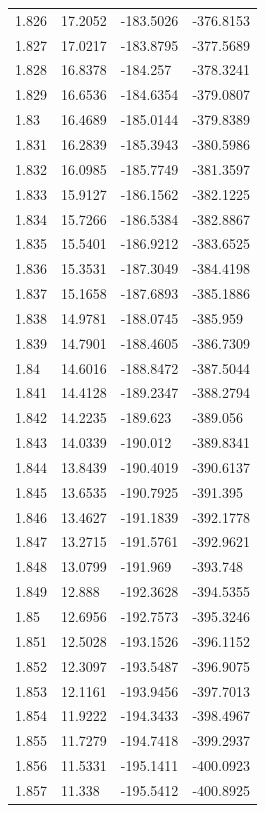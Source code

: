 \begin{tabular}{llll}
1.826 & 17.2052 & -183.5026 & -376.8153 \\
1.827 & 17.0217 & -183.8795 & -377.5689 \\
1.828 & 16.8378 & -184.257 & -378.3241 \\
1.829 & 16.6536 & -184.6354 & -379.0807 \\
1.83 & 16.4689 & -185.0144 & -379.8389 \\
1.831 & 16.2839 & -185.3943 & -380.5986 \\
1.832 & 16.0985 & -185.7749 & -381.3597 \\
1.833 & 15.9127 & -186.1562 & -382.1225 \\
1.834 & 15.7266 & -186.5384 & -382.8867 \\
1.835 & 15.5401 & -186.9212 & -383.6525 \\
1.836 & 15.3531 & -187.3049 & -384.4198 \\
1.837 & 15.1658 & -187.6893 & -385.1886 \\
1.838 & 14.9781 & -188.0745 & -385.959 \\
1.839 & 14.7901 & -188.4605 & -386.7309 \\
1.84 & 14.6016 & -188.8472 & -387.5044 \\
1.841 & 14.4128 & -189.2347 & -388.2794 \\
1.842 & 14.2235 & -189.623 & -389.056 \\
1.843 & 14.0339 & -190.012 & -389.8341 \\
1.844 & 13.8439 & -190.4019 & -390.6137 \\
1.845 & 13.6535 & -190.7925 & -391.395 \\
1.846 & 13.4627 & -191.1839 & -392.1778 \\
1.847 & 13.2715 & -191.5761 & -392.9621 \\
1.848 & 13.0799 & -191.969 & -393.748 \\
1.849 & 12.888 & -192.3628 & -394.5355 \\
1.85 & 12.6956 & -192.7573 & -395.3246 \\
1.851 & 12.5028 & -193.1526 & -396.1152 \\
1.852 & 12.3097 & -193.5487 & -396.9075 \\
1.853 & 12.1161 & -193.9456 & -397.7013 \\
1.854 & 11.9222 & -194.3433 & -398.4967 \\
1.855 & 11.7279 & -194.7418 & -399.2937 \\
1.856 & 11.5331 & -195.1411 & -400.0923 \\
1.857 & 11.338 & -195.5412 & -400.8925 \\

\end{tabular}

